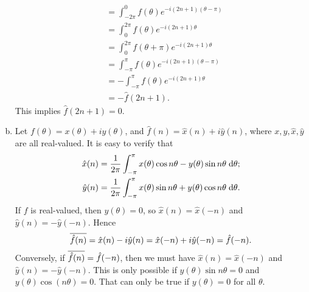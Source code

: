 \begin{exrc}[2]
\begin{soln}
\begin{enumerate}[(a)]
\begin{align*}
            &= \int_{-2\pi}^{0} f(\theta) e^{-i(2n + 1)(\theta - \pi)} \\
            &= \int_{0}^{2\pi} f(\theta) e^{-i(2n + 1) \theta} \\
            &= \int_{0}^{2\pi} f(\theta + \pi) e^{-i(2n + 1) \theta} \\
            &= \int_{-\pi}^{\pi} f(\theta) e^{-i(2n + 1) (\theta - \pi)} \\
            &= -\int_{-\pi}^{\pi} f(\theta) e^{-i(2n + 1) \theta} \\
            &= -\hat{f}(2n + 1).
        \end{align*}
        This implies \(\hat{f}(2n + 1) = 0\).
   \item
       Let \(f(\theta) = x(\theta) + iy(\theta)\), and \(\hat{f}(n) = \hat{x}(n) + i\hat{y}(n)\),
       where \(x, y, \hat{x}, \hat{y}\) are all real-valued.
       It is easy to verify that
       \begin{align*}
           \hat{x}(n) &= \frac{1}{2\pi} \int_{-\pi}^{\pi} x(\theta) \cos n\theta - y(\theta) \sin n\theta \;\mathrm d \theta; \\
           \hat{y}(n) &= \frac{1}{2\pi} \int_{-\pi}^{\pi} x(\theta) \sin n\theta + y(\theta) \cos n\theta \;\mathrm d \theta.
       \end{align*}
       If \(f\) is real-valued, then \(y(\theta) = 0\),
       so \(\hat{x}(n) = \hat{x}(-n)\) and \(\hat{y}(n) = -\hat{y}(-n)\).
       Hence
       \begin{equation*}
           \overline{\hat{f}(n)} = \hat{x}(n) - i\hat{y}(n) = \hat{x}(-n) + i\hat{y}(-n) = \hat{f}(-n).
       \end{equation*}
       Conversely, if \(\overline{\hat{f}(n)} = \hat{f}(-n)\),
       then we must have \(\hat{x}(n) = \hat{x}(-n)\) and \(\hat{y}(n) = -\hat{y}(-n)\).
       This is only possible if \(y(\theta) \sin n\theta = 0\) and \(y(\theta) \cos(n\theta) = 0\).
       That can only be true if \(y(\theta) = 0\) for all \(\theta\).
        
    \end{enumerate}

\end{soln}
\end{exrc}

